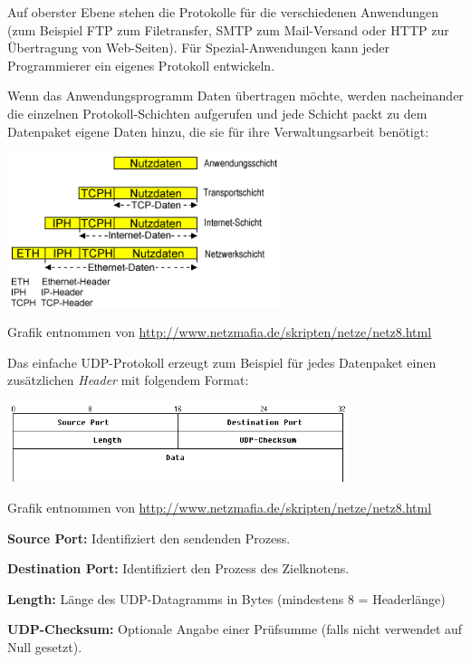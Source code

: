 Auf oberster Ebene stehen die Protokolle für die verschiedenen Anwendungen
(zum Beispiel FTP zum Filetransfer, SMTP zum Mail-Versand oder HTTP zur
Übertragung von Web-Seiten). Für Spezial-Anwendungen kann jeder Programmierer
ein eigenes Protokoll entwickeln.

Wenn das Anwendungsprogramm Daten übertragen möchte, werden nacheinander die
einzelnen Protokoll-Schichten aufgerufen und jede Schicht packt zu dem
Datenpaket eigene Daten hinzu, die sie für ihre Verwaltungsarbeit benötigt:

\begin{center}
\includegraphics[width=0.6\textwidth]{./inf/SEKII/42_Netzwerke/schichten.png}

Grafik entnommen von \url{http://www.netzmafia.de/skripten/netze/netz8.html}
\end{center}

Das einfache UDP-Protokoll erzeugt zum Beispiel für jedes Datenpaket einen
zusätzlichen \emph{Header} mit folgendem Format:

\begin{center}
\includegraphics[width=0.75\textwidth]{./inf/SEKII/42_Netzwerke/udp.png}

Grafik entnommen von \url{http://www.netzmafia.de/skripten/netze/netz8.html}
\end{center}

\begin{compactitem}
\item[\textbf{Source Port:}] Identifiziert den sendenden Prozess. 

\item[\textbf{Destination Port:}] Identifiziert den Prozess des Zielknotens. 

\item[\textbf{Length:}] Länge des UDP-Datagramms in Bytes (mindestens 8 =
Headerlänge)

\item[\textbf{UDP-Checksum:}] Optionale Angabe einer Prüfsumme (falls nicht
verwendet auf Null gesetzt).
\end{compactitem}

